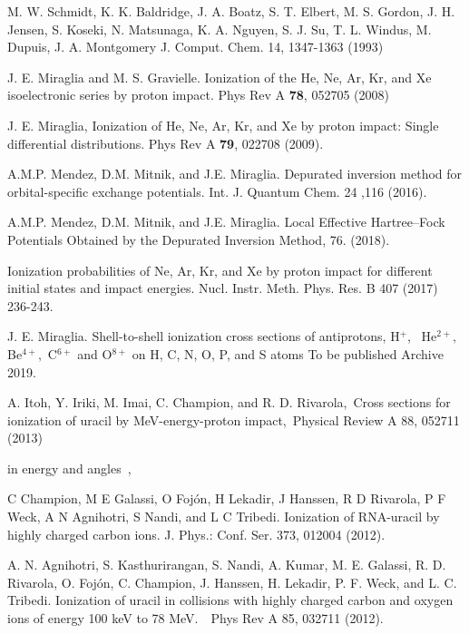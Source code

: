 \documentclass[preprint,12pt]{article}
\begin{document}
\begin{thebibliography}{99}

M. W. Schmidt, K. K. Baldridge, J. A. Boatz, S. T. Elbert, M. S. Gordon, 
J. H. Jensen, S. Koseki, N. Matsunaga, K. A. Nguyen, S. J. Su, T. L. Windus, 
M. Dupuis, J. A. Montgomery 
J. Comput. Chem. 14, 1347-1363 (1993)

J. E. Miraglia and M. S. Gravielle. Ionization of the
He, Ne, Ar, Kr, and Xe isoelectronic series by proton impact. Phys Rev A 
\textbf{78}, 052705 (2008)

J. E. Miraglia, Ionization of He, Ne, Ar, Kr, and Xe
by proton impact: Single differential distributions. Phys Rev A \textbf{79},
022708 (2009).

A.M.P. Mendez, D.M. Mitnik, and J.E. Miraglia.
Depurated inversion method for orbital-specific exchange potentials. 
Int. J. Quantum Chem. 24 ,116 (2016).

A.M.P. Mendez, D.M. Mitnik, and J.E. Miraglia. Local Effective 
Hartree--Fock Potentials Obtained by the Depurated Inversion Method,
76. (2018).

Ionization probabilities of Ne, Ar, Kr, and Xe by
proton impact for different initial states and impact energies. Nucl. Instr.
Meth. Phys. Res. B 407 (2017) 236-243.

J. E. Miraglia. Shell-to-shell ionization cross
sections of antiprotons, H$^{+}$, \ He$^{2+},$ Be$^{4+},$ C$^{6+}$ and O$%
^{8+}$ on H, C, N, O, P, and S atoms To be published Archive 2019.

A. Itoh, Y. Iriki, M. Imai, C. Champion, and R. D.
Rivarola,~Cross sections for ionization of uracil by MeV-energy-proton
impact,\ Physical Review A 88, 052711 (2013)

\bibitem{} in energy and angles~,

C Champion, M E Galassi, O Foj\'{o}n, H Lekadir, J Hanssen, R D Rivarola,
P F Weck, A N Agnihotri, S Nandi, and L C Tribedi. Ionization of RNA-uracil
by highly charged carbon ions. J. Phys.: Conf. Ser. 373, 012004 (2012).

A. N. Agnihotri, S. Kasthurirangan, S. Nandi, A.
Kumar, M. E. Galassi, R. D. Rivarola, O. Foj\'{o}n, C. Champion, J. Hanssen,
H. Lekadir, P. F. Weck, and L. C. Tribedi. Ionization of uracil in
collisions with highly charged carbon and oxygen ions of energy 100 keV to
78 MeV.\ \ Phys Rev A 85, 032711 (2012).


\end{thebibliography}
\end{document}
